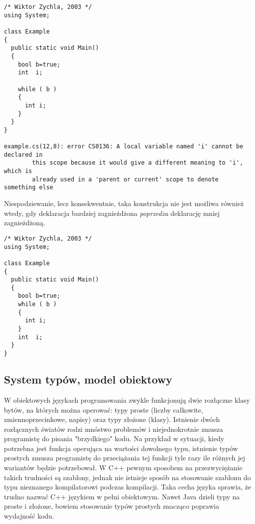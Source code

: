\begin{scriptsize}
\begin{verbatim}
/* Wiktor Zychla, 2003 */
using System;

class Example
{
  public static void Main()
  {
    bool b=true;
    int  i;

    while ( b )
    {
      int i;
    }
  }
}

example.cs(12,8): error CS0136: A local variable named 'i' cannot be declared in
        this scope because it would give a different meaning to 'i', which is
        already used in a 'parent or current' scope to denote something else
\end{verbatim}
\end{scriptsize}

Niespodziewanie, lecz konsekwentnie, taka konstrukcja nie jest możliwa również wtedy, gdy
deklaracja bardziej zagnieżdżona {\em poprzedza} deklarację mniej zagnieżdżoną.

\begin{scriptsize}
\begin{verbatim}
/* Wiktor Zychla, 2003 */
using System;

class Example
{
  public static void Main()
  {
    bool b=true;
    while ( b )
    {
      int i;
    }
    int  i;
  }
}
\end{verbatim}
\end{scriptsize}

\subsection{System typów, model obiektowy}

W obiektowych językach programowania zwykle funkcjonują dwie rozłączne klasy bytów, na których można
operować: typy proste (liczby całkowite, zmiennoprzecinkowe, napisy) oraz typy złożone (klasy). Istnienie
dwóch rozłącznych światów rodzi mnóstwo problemów i niejednokrotnie zmusza programistę do pisania
"brzydkiego" kodu. Na przykład w sytuacji, kiedy potrzebna jest funkcja operująca na wartości dowolnego
typu, istnienie typów prostych zmusza programistę do przeciążania tej funkcji tyle razy ile różnych
jej wariantów będzie potrzebował. W C++ pewnym sposobem na przezwyciężanie takich trudności są 
szablony, jednak nie istnieje sposób na stosowanie szablonu do typu nieznanego kompilatorowi podczas kompilacji.
Taka cecha języka sprawia, że trudno nazwać C++ językiem w pełni obiektowym. Nawet Java dzieli typy
na proste i złożone, bowiem stosowanie typów prostych znacząco poprawia wydajność kodu.

